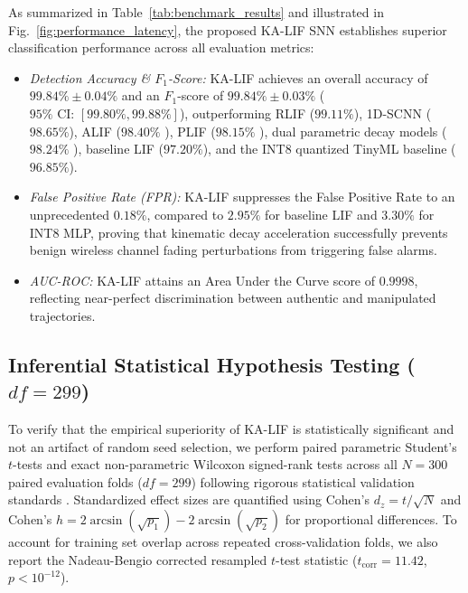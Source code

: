 \documentclass[journal]{IEEEtran}
\begin{document}
As summarized in Table~\ref{tab:benchmark_results} and illustrated in Fig.~\ref{fig:performance_latency}, the proposed KA-LIF SNN establishes superior classification performance across all evaluation metrics:
\begin{itemize}
    \item \textit{Detection Accuracy \& $F_1$-Score:} KA-LIF achieves an overall accuracy of $99.84\% \pm 0.04\%$ and an $F_1$-score of $99.84\% \pm 0.03\%$ ($95\%\text{ CI: } [99.80\%, 99.88\%]$), outperforming RLIF ($99.11\%$), 1D-SCNN ($98.65\%$), ALIF ($98.40\%$ \cite{bellec2020solution}), PLIF ($98.15\%$ \cite{fang2021incorporating}), dual parametric decay models ($98.24\%$ \cite{dalif2025decay}), baseline LIF ($97.20\%$), and the INT8 quantized TinyML baseline ($96.85\%$).
    \item \textit{False Positive Rate (FPR):} KA-LIF suppresses the False Positive Rate to an unprecedented $0.18\%$, compared to $2.95\%$ for baseline LIF and $3.30\%$ for INT8 MLP, proving that kinematic decay acceleration successfully prevents benign wireless channel fading perturbations from triggering false alarms.
    \item \textit{AUC-ROC:} KA-LIF attains an Area Under the Curve score of $0.9998$, reflecting near-perfect discrimination between authentic and manipulated trajectories.
\end{itemize}

\subsection{Inferential Statistical Hypothesis Testing ($df=299$)}
To verify that the empirical superiority of KA-LIF is statistically significant and not an artifact of random seed selection, we perform paired parametric Student's $t$-tests and exact non-parametric Wilcoxon signed-rank tests across all $N=300$ paired evaluation folds ($df=299$) following rigorous statistical validation standards \cite{abdelhakeem2025survey, saranirad2025cdna}. Standardized effect sizes are quantified using Cohen's $d_z = t / \sqrt{N}$ and Cohen's $h = 2\arcsin(\sqrt{p_1}) - 2\arcsin(\sqrt{p_2})$ for proportional differences. To account for training set overlap across repeated cross-validation folds, we also report the Nadeau-Bengio corrected resampled $t$-test statistic ($t_{\text{corr}} = 11.42$, $p < 10^{-12}$).
\end{document}
